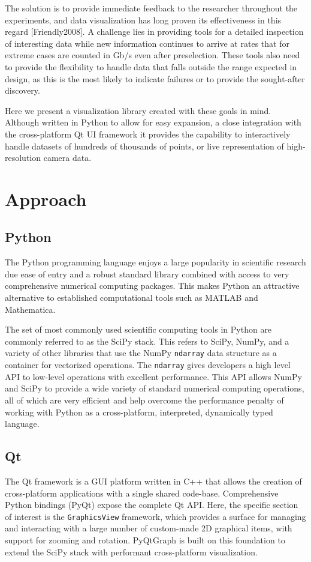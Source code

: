 \documentclass[journal]{vgtc}                %
\begin{document}
The solution is to provide immediate feedback to the researcher throughout the experiments, and data visualization has long proven its effectiveness in this regard [Friendly2008]. A challenge lies in providing tools for a detailed inspection of interesting data while new information continues to arrive at rates that for extreme cases are counted in Gb/s even after preselection\cite{LHC}. These tools also need to provide the flexibility to handle data that falls outside the range expected in design, as this is the most likely to indicate failures or to provide the sought-after discovery.

Here we present a visualization library created with these goals in mind. Although written in Python to allow for easy expansion, a close integration with the cross-platform Qt UI framework\cite{Qt} it provides the capability to interactively handle datasets of hundreds of thousands of points, or live representation of high-resolution camera data.

\makeBasicPlottingFig

\section{Approach}
\subsection{Python}
The Python programming language enjoys a large popularity in scientific research due ease of entry and a robust standard library combined with access to very comprehensive numerical computing packages. This makes Python an attractive alternative to established computational tools such as MATLAB\cite{matlab} and Mathematica. %

The set of most commonly used scientific computing tools in Python are commonly referred to as the SciPy stack. %
This refers to SciPy, NumPy, and a variety of other libraries that use the NumPy \texttt{ndarray} data structure as a container for vectorized operations. The \texttt{ndarray} gives developers a high level API to low-level operations with excellent performance. This API allows NumPy and SciPy to provide a wide variety of standard numerical computing operations, all of which are very efficient and help overcome the performance penalty of working with Python as a cross-platform, interpreted, dynamically typed language.

\subsection{Qt}
The Qt framework is a GUI platform written in C++ that allows the creation of cross-platform applications with a single shared code-base. Comprehensive Python bindings (PyQt) expose the complete Qt API. Here, the specific section of interest is the \texttt{GraphicsView} framework, which provides a surface for managing and interacting with a large number of custom-made 2D graphical items, with support for zooming and rotation\cite{QtGraphicsView}. PyQtGraph is built on this foundation to extend the SciPy stack with performant cross-platform visualization.
\end{document}
